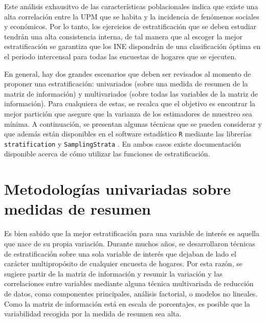 \documentclass[
  12pt,
]{book}
\begin{document}
Este análisis exhausitvo de las características poblacionales indica que existe una alta correlación entre la UPM que se habita y la incidencia de fenómenos sociales y económicos. Por lo tanto, los ejercicios de estratificación que se deben estudiar tendrán una alta consistencia interna, de tal manera que al escoger la mejor estratificación se garantiza que los INE dispondrán de una clasificación óptima en el periodo intercensal para todas las encuestas de hogares que se ejecuten.

En general, hay dos grandes escenarios que deben ser revisados al momento de proponer una estratificación: univariados (sobre una medida de resumen de la matriz de información) y multivariados (sobre todas las variables de la matriz de información). Para cualquiera de estas, se recalca que el objetivo es encontrar la mejor partición que asegure que la varianza de los estimadores de muestreo sea mínima. A continuación, se presentan algunas técnicas que se pueden considerar y que además están disponibles en el software estadístico \texttt{R} mediante las librerías \texttt{stratification} \citep{Baillargeon_Rivest_2011} y \texttt{SamplingStrata} \citep{Barcaroli_2014}. En ambos casos existe documentación disponible acerca de cómo utilizar las funciones de estratificación.

\hypertarget{metodologuxedas-univariadas-sobre-medidas-de-resumen}{%
\section{Metodologías univariadas sobre medidas de resumen}\label{metodologuxedas-univariadas-sobre-medidas-de-resumen}}

Es bien sabido que la mejor estratificación para una variable de interés es aquella que nace de su propia variación. Durante muchos años, se desarrollaron técnicas de estratificación sobre una sola variable de interés que dejaban de lado el carácter multipropósito de cualquier encuesta de hogares. Por esta razón, se sugiere partir de la matriz de información y resumir la variación y las correlaciones entre variables mediante alguna técnica multivariada de reducción de datos, como componentes principales, análisis factorial, o modelos no lineales. Como la matriz de información está en escala de porcentajes, es posible que la variabilidad recogida por la medida de resumen sea alta.
\end{document}
